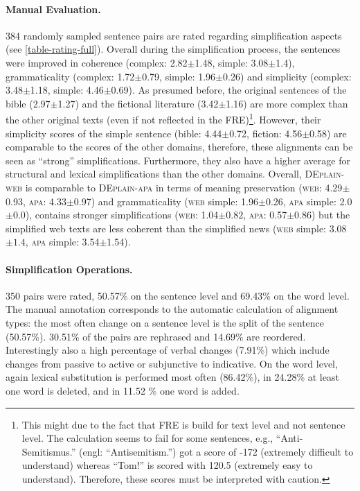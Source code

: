 \documentclass[11pt]{article}
\begin{document}
\paragraph{Manual Evaluation.}
384 randomly sampled sentence pairs  are rated regarding simplification aspects (see \autoref{table-rating-full}). 
Overall during the simplification process, the sentences were improved in coherence (complex: 2.82$\pm$1.48, simple: 3.08$\pm$1.4), grammaticality (complex: 1.72$\pm$0.79, simple: 1.96$\pm$0.26) and simplicity (complex: 3.48$\pm$1.18,  simple: 4.46$\pm$0.69). 
As presumed before, the original sentences of the bible (2.97$\pm$1.27) and the fictional literature (3.42$\pm$1.16) are more complex than the other original texts (even if not reflected in the FRE)\footnote{This might due to the fact that FRE is build for text level and not sentence level. The calculation seems to fail for some sentences, e.g., ``Anti-Semitismus.'' (engl: ``Antisemitism.'') got a score of -172 (extremely difficult to understand) whereas ``Tom!'' is scored with 120.5 (extremely easy to understand). Therefore, these scores must be interpreted with caution.}. However, their simplicity scores of the simple sentence (bible: 4.44$\pm$0.72, fiction: 4.56$\pm$0.58) are comparable to the scores of the other domains, therefore, these alignments can be seen as ``strong'' simplifications.  Furthermore, they also have a higher average for structural and lexical simplifications than the other domains. Overall, \textsc{DEplain-web} is comparable to \textsc{DEplain-apa} in terms of meaning preservation (\textsc{web}: 4.29$\pm$0.93, \textsc{apa}: 4.33$\pm$0.97) and grammaticality (\textsc{web} simple: 1.96$\pm$0.26, \textsc{apa} simple: 2.0$\pm$0.0), contains stronger simplifications (\textsc{web}: 1.04$\pm0.82$, \textsc{apa}: 0.57$\pm0.86$) but the simplified web texts are less coherent than the simplified news (\textsc{web} simple: 3.08$\pm1.4$, \textsc{apa} simple: 3.54$\pm$1.54).




\paragraph{Simplification Operations.}
350 pairs were rated, 50.57\% on the sentence level and 69.43\% on the word level. The manual annotation corresponds to the automatic calculation of alignment types: the most often change on a sentence level is the split of the sentence (50.57\%). 30.51\% of the pairs are rephrased and 14.69\% are reordered. Interestingly also a high percentage of verbal changes (7.91\%) which include changes from passive to active or subjunctive to indicative. On the word level, again lexical substitution is performed most often (86.42\%), in 24.28\% at least one word is deleted, and in 11.52 \% one word is added.
\end{document}
